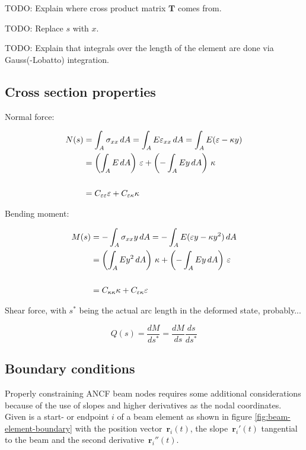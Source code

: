 TODO: Explain where cross product matrix $\boldsymbol{T}$ comes from.

TODO: Replace $s$ with $x$.

TODO: Explain that integrals over the length of the element are done via Gauss(-Lobatto) integration.

\newpage
\subsection{Cross section properties}

Normal force:

\begin{align}
N(s) &= \int_A \sigma_{xx}\,dA = \int_A E\varepsilon_{xx}\,dA = \int_A E(\varepsilon - \kappa y) \notag \\
&= \left(\int_A E\,dA\right)\,\varepsilon + \left(-\int_A Ey\,dA\right)\,\kappa \notag \\
\notag \\
&= C_{\varepsilon\varepsilon}\varepsilon + C_{\varepsilon\kappa}\kappa
\end{align}

Bending moment:

\begin{align}
M(s) &= -\int_A \sigma_{xx}y\,dA = -\int_A E(\varepsilon y - \kappa y^2)\,dA \notag \\
&= \left(\int_A Ey^2\,dA\right)\,\kappa + \left(-\int_A Ey\,dA\right)\,\varepsilon \notag \\
\notag \\
&= C_{\kappa\kappa}\kappa + C_{\varepsilon\kappa}\varepsilon
\end{align}

Shear force, with $s^*$ being the actual arc length in the deformed state, probably...

\begin{equation}
Q(s) = \frac{dM}{ds^*} = \frac{dM}{ds}\frac{ds}{ds^*}
\end{equation}




\newpage
\subsection{Boundary conditions}

Properly constraining ANCF beam nodes requires some additional considerations because of the use of slopes and higher derivatives as the nodal coordinates.
Given is a start- or endpoint $i$ of a beam element as shown in figure \ref{fig:beam-element-boundary} with the position vector~$\boldsymbol{r}_{i}(t)$, the slope~$\boldsymbol{r}_{i}'(t)$ tangential to the beam and the second derivative~$\boldsymbol{r}_{i}''(t)$.

